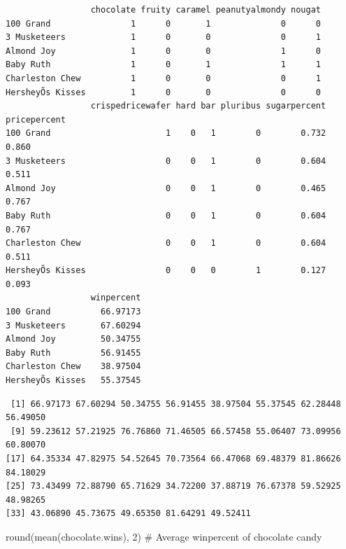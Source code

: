 \documentclass[
  letterpaper,
  DIV=11,
  numbers=noendperiod]{scrartcl}
\newenvironment{Shaded}{\begin{snugshade}}{\end{snugshade}}
\newcommand{\CommentTok}[1]{\textcolor[rgb]{0.37,0.37,0.37}{#1}}
\newcommand{\DecValTok}[1]{\textcolor[rgb]{0.68,0.00,0.00}{#1}}
\newcommand{\FunctionTok}[1]{\textcolor[rgb]{0.28,0.35,0.67}{#1}}
\newcommand{\NormalTok}[1]{\textcolor[rgb]{0.00,0.23,0.31}{#1}}
\newcommand{\OtherTok}[1]{\textcolor[rgb]{0.00,0.23,0.31}{#1}}
\newcommand{\SpecialCharTok}[1]{\textcolor[rgb]{0.37,0.37,0.37}{#1}}
\begin{document}
\begin{verbatim}
                 chocolate fruity caramel peanutyalmondy nougat
100 Grand                1      0       1              0      0
3 Musketeers             1      0       0              0      1
Almond Joy               1      0       0              1      0
Baby Ruth                1      0       1              1      1
Charleston Chew          1      0       0              0      1
HersheyÕs Kisses         1      0       0              0      0
                 crispedricewafer hard bar pluribus sugarpercent pricepercent
100 Grand                       1    0   1        0        0.732        0.860
3 Musketeers                    0    0   1        0        0.604        0.511
Almond Joy                      0    0   1        0        0.465        0.767
Baby Ruth                       0    0   1        0        0.604        0.767
Charleston Chew                 0    0   1        0        0.604        0.511
HersheyÕs Kisses                0    0   0        1        0.127        0.093
                 winpercent
100 Grand          66.97173
3 Musketeers       67.60294
Almond Joy         50.34755
Baby Ruth          56.91455
Charleston Chew    38.97504
HersheyÕs Kisses   55.37545
\end{verbatim}

\begin{Shaded}
\end{Shaded}

\begin{verbatim}
 [1] 66.97173 67.60294 50.34755 56.91455 38.97504 55.37545 62.28448 56.49050
 [9] 59.23612 57.21925 76.76860 71.46505 66.57458 55.06407 73.09956 60.80070
[17] 64.35334 47.82975 54.52645 70.73564 66.47068 69.48379 81.86626 84.18029
[25] 73.43499 72.88790 65.71629 34.72200 37.88719 76.67378 59.52925 48.98265
[33] 43.06890 45.73675 49.65350 81.64291 49.52411
\end{verbatim}

\begin{Shaded}
\begin{Highlighting}[]
\FunctionTok{round}\NormalTok{(}\FunctionTok{mean}\NormalTok{(chocolate.wins), }\DecValTok{2}\NormalTok{) }\CommentTok{\# Average winpercent of chocolate candy}
\end{Highlighting}
\end{Shaded}
\end{document}
